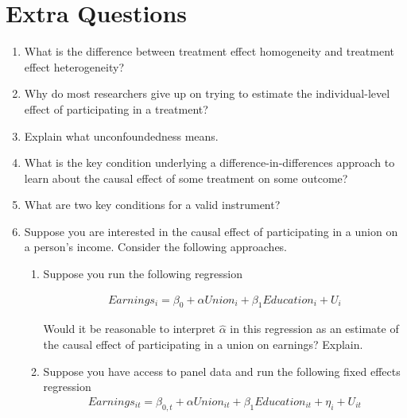\documentclass[
  letterpaper,
  DIV=11,
  numbers=noendperiod]{scrreprt}
\begin{document}
\section{Extra Questions}\label{extra-questions-5}

\begin{enumerate}
\def\labelenumi{\arabic{enumi}.}
\item
  What is the difference between treatment effect homogeneity and
  treatment effect heterogeneity?
\item
  Why do most researchers give up on trying to estimate the
  individual-level effect of participating in a treatment?
\item
  Explain what unconfoundedness means.
\item
  What is the key condition underlying a difference-in-differences
  approach to learn about the causal effect of some treatment on some
  outcome?
\item
  What are two key conditions for a valid instrument?
\item
  Suppose you are interested in the causal effect of participating in a
  union on a person's income. Consider the following approaches.

  \begin{enumerate}
  \def\labelenumii{\alph{enumii})}
  \item
    Suppose you run the following regression

    \begin{align*}
       Earnings_i = \beta_0 + \alpha Union_i + \beta_1 Education_i + U_i
     \end{align*}

    Would it be reasonable to interpret \(\hat{\alpha}\) in this
    regression as an estimate of the causal effect of participating in a
    union on earnings? Explain.
  \item
    Suppose you have access to panel data and run the following fixed
    effects regression \begin{align*}
       Earnings_{it} = \beta_{0,t} + \alpha Union_{it} + \beta_1 Education_{it} + \eta_i + U_{it}
     \end{align*}


\end{enumerate}
\end{enumerate}
\end{document}
